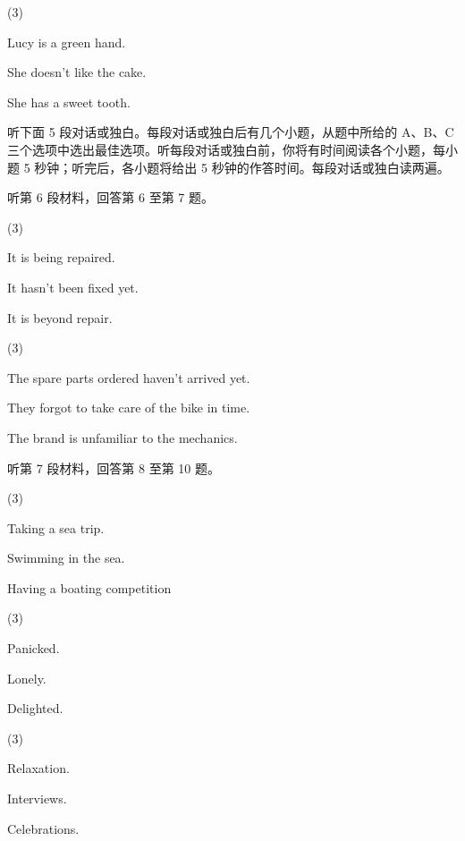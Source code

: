 \documentclass{英语试卷}
\begin{document}
\begin{choices}(3)
  \item Lucy is a green hand.
  \item She doesn't like the cake.
  \item She has a sweet tooth.
\end{choices}
\par 听下面 5 段对话或独白。每段对话或独白后有几个小题，从题中所给的 A、B、C 三个选项中选出最佳选项。听每段对话或独白前，你将有时间阅读各个小题，每小题 5 秒钟；听完后，各小题将给出 5 秒钟的作答时间。每段对话或独白读两遍。\par
\par 听第 6 段材料，回答第 6 至第 7 题。\par
{}
\begin{choices}(3)
  \item It is being repaired.
  \item It hasn't been fixed yet.
  \item It is beyond repair.
\end{choices}
\begin{choices}(3)
  \item The spare parts ordered haven't arrived yet.
  \item They forgot to take care of the bike in time.
  \item The brand is unfamiliar to the mechanics.
\end{choices}
\par 听第 7 段材料，回答第 8 至第 10 题。\par
{}
\begin{choices}(3)
  \item Taking a sea trip.
  \item Swimming in the sea.
  \item Having a boating competition
\end{choices}
\begin{choices}(3)
  \item Panicked.
  \item Lonely.
  \item Delighted.
\end{choices}
\begin{choices}(3)
  \item Relaxation.
  \item Interviews.
  \item Celebrations.
\end{choices}
\end{document}
